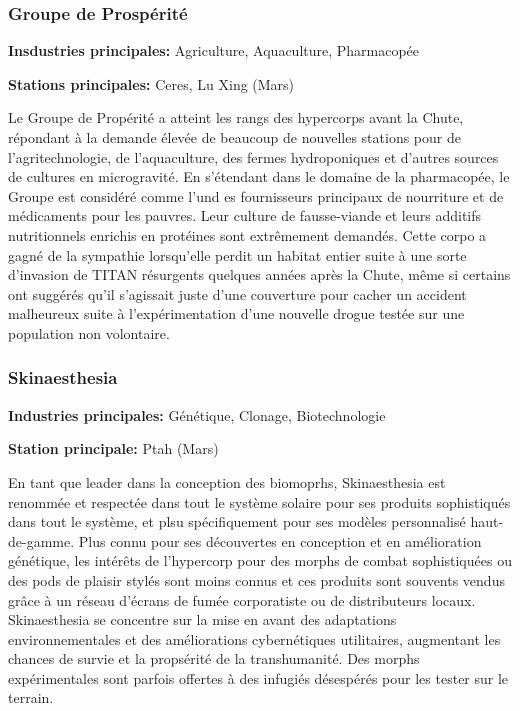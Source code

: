                         \subsubsection{Groupe de Prospérité} \label{sec:prosperity-group} 

                        \textbf{Insdustries principales:} Agriculture, Aquaculture, Pharmacopée 

                        \textbf{Stations principales:} Ceres, Lu Xing (Mars) 

                        Le Groupe de Propérité a atteint les rangs des hypercorps avant la Chute, répondant à la demande élevée de beaucoup de nouvelles stations pour de l'agritechnologie, de l'aquaculture, des fermes hydroponiques et d'autres sources de cultures en microgravité. En s'étendant dans le domaine de la pharmacopée, le Groupe est considéré comme l'und es fournisseurs principaux de nourriture et de médicaments pour les pauvres. Leur culture de fausse-viande et leurs additifs nutritionnels enrichis en protéines sont extrêmement demandés. Cette corpo a gagné de la sympathie lorsqu'elle perdit un habitat entier suite à une sorte d'invasion de TITAN résurgents quelques années après la Chute, même si certains ont suggérés qu'il s'agissait juste d'une couverture pour cacher un accident malheureux suite à l'expérimentation d'une nouvelle drogue testée sur une population non volontaire. 

                        \subsubsection{Skinaesthesia} \label{sec:skinaethesia} 

                        \textbf{Industries principales:} Génétique, Clonage, Biotechnologie 

                        \textbf{Station principale:} Ptah (Mars) 

                        En tant que leader dans la conception des biomoprhs, Skinaesthesia est renommée et respectée dans tout le système solaire pour ses produits sophistiqués dans tout le système, et plsu spécifiquement pour ses modèles personnalisé haut-de-gamme. Plus connu pour ses découvertes en conception et en amélioration génétique, les intérêts de l'hypercorp pour des morphs de combat sophistiquées ou des pods de plaisir stylés sont moins connus et ces produits sont souvents vendus grâce à un réseau d'écrans de fumée corporatiste ou de distributeurs locaux. Skinaesthesia se concentre sur la mise en avant des adaptations environnementales et des améliorations cybernétiques utilitaires, augmentant les chances de survie et la propsérité de la transhumanité. Des morphs expérimentales sont parfois offertes à des infugiés désespérés pour les tester sur le terrain. 

